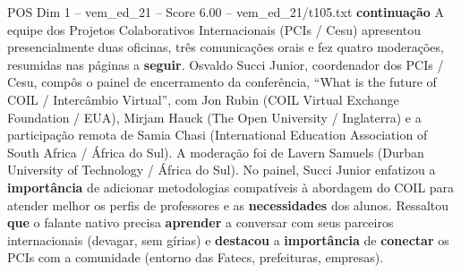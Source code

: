\begin{textsample}{POS Dim 1 – vem\_ed\_21 – Score 6.00 – vem\_ed\_21/t105.txt}  \label{ex:f1_pos_168}
\textbf{continuação} A equipe dos Projetos Colaborativos Internacionais (PCIs / Cesu) apresentou presencialmente duas oficinas, três comunicações orais e fez quatro moderações, resumidas nas páginas a \textbf{seguir}.
Osvaldo Succi Junior, coordenador dos PCIs / Cesu, compôs o painel de encerramento da conferência, “What is the future of COIL / Intercâmbio Virtual”, com Jon Rubin (COIL Virtual Exchange Foundation / EUA), Mirjam Hauck (The Open University / Inglaterra) e a participação remota de Samia Chasi (International Education Association of South Africa / África do Sul).
A moderação foi de Lavern Samuels (Durban University of Technology / África do Sul).
No painel, Succi Junior enfatizou a \textbf{importância} de adicionar metodologias compatíveis à abordagem do COIL para atender melhor os perfis de professores e as \textbf{necessidades} dos alunos.
Ressaltou \textbf{que} o falante nativo precisa \textbf{aprender} a conversar com seus parceiros internacionais (devagar, sem gírias) e \textbf{destacou} a \textbf{importância} de \textbf{conectar} os PCIs com a comunidade (entorno das Fatecs, prefeituras, empresas).

\end{textsample}
